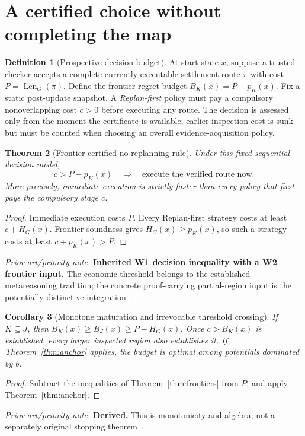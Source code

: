\documentclass[11pt,letterpaper]{article}
\newtheorem{theorem}{Theorem}[section]
\newtheorem{corollary}[theorem]{Corollary}
\theoremstyle{definition}
\newtheorem{definition}[theorem]{Definition}
\theoremstyle{remark}
\newcommand{\Len}{\operatorname{Len}}
\newcommand{\novel}[1]{\par\begingroup\small\textit{Prior-art/priority note.} #1\par\endgroup}
\begin{document}
\section{A certified choice without completing the map}
\begin{definition}[Prospective decision budget]\label{def:budget}
At start state \(x\), suppose a trusted checker accepts a complete currently executable settlement route \(\pi\) with cost \(P=\Len_G(\pi)\). Define the frontier regret budget \(B_K(x)=P-p_K(x)\). Fix a static post-update snapshot. A \emph{Replan-first} policy must pay a compulsory nonoverlapping cost \(c>0\) before executing any route. The decision is assessed only from the moment the certificate is available; earlier inspection cost is sunk but must be counted when choosing an overall evidence-acquisition policy.
\end{definition}
\begin{theorem}[Frontier-certified no-replanning rule]\label{thm:stop}
Under this fixed sequential decision model,
\begin{equation}\label{eq:stopping}
\boxed{\qquad c>P-p_K(x)\quad\Longrightarrow\quad\text{execute the verified route now}.\qquad}
\end{equation}
More precisely, immediate execution is strictly faster than every policy that first pays the compulsory stage \(c\).
\end{theorem}
\begin{proof}
Immediate execution costs \(P\). Every Replan-first strategy costs at least \(c+H_G(x)\). Frontier soundness gives \(H_G(x)\ge p_K(x)\), so such a strategy costs at least \(c+p_K(x)>P\).
\end{proof}
\novel{\textbf{Inherited W1 decision inequality with a W2 frontier input.} The economic threshold belongs to the established metareasoning tradition; the concrete proof-carrying partial-region input is the potentially distinctive integration~\cite{W1,W2,Russell1991,Korf1990,Christen2025}.}

\begin{corollary}[Monotone maturation and irrevocable threshold crossing]\label{cor:maturity}
If \(K\subseteq J\), then \(B_K(x)\ge B_J(x)\ge P-H_G(x)\). Once \(c>B_K(x)\) is established, every larger inspected region also establishes it. If Theorem~\ref{thm:anchor} applies, the budget is optimal among potentials dominated by \(b\).
\end{corollary}
\begin{proof}Subtract the inequalities of Theorem~\ref{thm:frontiers} from \(P\), and apply Theorem~\ref{thm:anchor}.\end{proof}
\novel{\textbf{Derived.} This is monotonicity and algebra; not a separately original stopping theorem~\cite{W2,Mohri}.}
\end{document}
